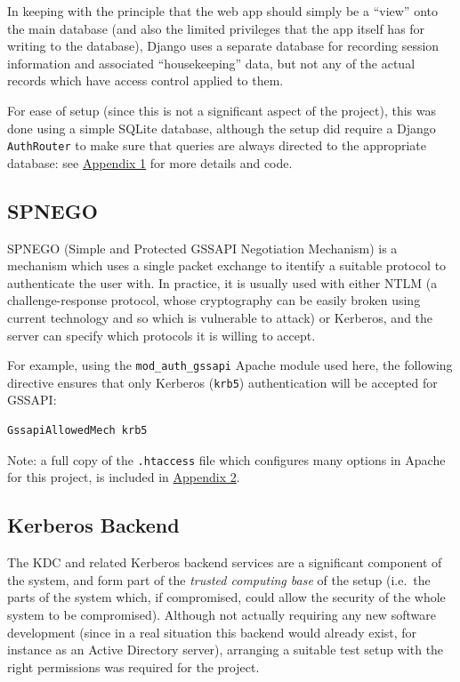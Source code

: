 \documentclass{article}
\begin{document}
In keeping with the principle that the web app should simply be a ``view'' onto the main database (and also the limited privileges that the app itself has for writing to the database), Django uses a separate database for recording session information and associated ``housekeeping'' data, but not any of the actual records which have access control applied to them.

For ease of setup (since this is not a significant aspect of the project), this was done using a simple SQLite database, although the setup did require a Django \texttt{AuthRouter} to make sure that queries are always directed to the appropriate database: see \hyperref[sec:appendix1]{Appendix 1} for more details and code.

\subsection{SPNEGO}
SPNEGO (Simple and Protected GSSAPI Negotiation Mechanism) is a mechanism which uses a single packet exchange to itentify a suitable protocol to authenticate the user with. In practice, it is usually used with either NTLM (a challenge-response protocol, whose cryptography can be easily broken using current technology and so which is vulnerable to attack) or Kerberos, and the server can specify which protocols it is willing to accept.

For example, using the \verb+mod_auth_gssapi+ Apache module used here, the following directive ensures that only Kerberos (\texttt{krb5}) authentication will be accepted for GSSAPI:

\begin{verbatim}
GssapiAllowedMech krb5
\end{verbatim}

Note: a full copy of the \verb+.htaccess+ file which configures many options in Apache for this project, is included in \hyperref[sec:appendix2]{Appendix 2}.

\subsection{Kerberos Backend}
The KDC and related Kerberos backend services are a significant component of the system, and form part of the \textit{trusted computing base} of the setup (i.e.\ the parts of the system which, if compromised, could allow the security of the whole system to be compromised). Although not actually requiring any new software development (since in a real situation this backend would already exist, for instance as an Active Directory server), arranging a suitable test setup with the right permissions was required for the project.
\end{document}
